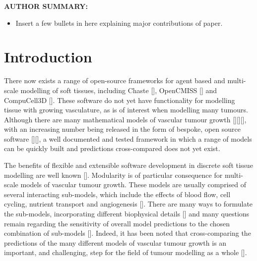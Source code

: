 \documentclass[superscriptaddress, a4paper]{article}
\newenvironment{authorsummary}
{\begin{framed} \begin{center} \begin{minipage}{0.9\textwidth} \noindent}
{\end{minipage} \end{center} \end{framed}}
\begin{document}
\vspace{1.5cm}

\begin{authorsummary}

\textbf{AUTHOR SUMMARY:}

\begin{itemize}
 \item Insert a few bullets in here explaining major contributions of paper.
\end{itemize}

\end{authorsummary}

\newpage

\setcounter{tocdepth}{3}
\tableofcontents

\newpage
\doublespacing

\section{Introduction}
\label{sec:introduction}

There now exists a range of open-source frameworks for agent based and multi-scale modelling of soft tissues, including Chaste [], OpenCMISS [] and CompuCell3D []. These software do not yet have functionality for modelling tissue with growing vasculature, as is of interest when modelling many tumours. Although there are many mathematical models of vascular tumour growth [][][], with an increasing number being released in the form of bespoke, open source software [][], a well documented and tested framework in which a range of models can be quickly built and predictions cross-compared does not yet exist.

The benefits of flexible and extensible software development in discrete soft tissue modelling are well known []. Modularity is of particular consequence for multi-scale models of vascular tumour growth. These models are usually comprised of several interacting sub-models, which include the effects of blood flow, cell cycling, nutrient transport and angiogenesis []. There are many ways to formulate the sub-models, incorporating different biophysical details [] and many questions remain regarding the sensitivity of overall model predictions to the chosen combination of sub-models []. Indeed, it has been noted that cross-comparing the predictions of the many different models of vascular tumour growth is an important, and challenging, step for the field of tumour modelling as a whole [].
\end{document}
